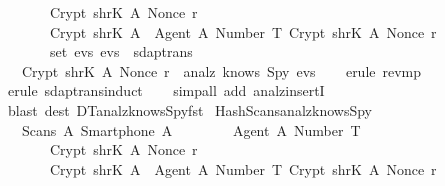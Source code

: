 \begin{isabellebody}
  \ \ \ \ \ \ \ Crypt\ {\isacharparenleft}shrK\ A{\isacharparenright}\ {\isacharparenleft}Nonce\ r{\isacharparenright}{\isacharcomma}\isanewline
  \ \ \ \ \ \ \ Crypt\ {\isacharparenleft}shrK\ A{\isacharparenright}\ {\isasymlbrace}\ {\isasymlbrace}Agent\ A{\isacharcomma}\ Number\ T{\isasymrbrace}{\isacharcomma}\ Crypt\ {\isacharparenleft}shrK\ A{\isacharparenright}\ {\isacharparenleft}Nonce\ r{\isacharparenright}\ {\isasymrbrace}\ \isanewline
  \ \ \ \ \ {\isasymrbrace}\ {\isasymin}\ set\ evs{\isacharsemicolon}\ evs\ {\isasymin}\ sdaptrans\ {\isasymrbrakk}\isanewline
  \ \ {\isasymLongrightarrow}\ Crypt\ {\isacharparenleft}shrK\ A{\isacharparenright}\ {\isacharparenleft}Nonce\ r{\isacharparenright}\ {\isasymin}\ analz\ {\isacharparenleft}knows\ Spy\ evs{\isacharparenright}{\isachardoublequoteclose}\isanewline
  \isadelimproof
  \isanewline
  \ \ %
  \endisadelimproof
  \isatagproof
  \isamarkupfalse%
  \ {\isacharparenleft}erule\ rev{\isacharunderscore}mp{\isacharparenright}\isanewline
  \ \ \isamarkupfalse%
  \ {\isacharparenleft}erule\ sdaptrans{\isachardot}induct{\isacharparenright}\isanewline
  \ \ \isamarkupfalse%
  \ {\isacharparenleft}simp{\isacharunderscore}all\ add{\isacharcolon}\ analz{\isacharunderscore}insertI{\isacharparenright}\isanewline
  \ \ \isamarkupfalse%
  \ {\isacharparenleft}blast\ dest{\isacharbang}{\isacharcolon}\ DT{}{\isacharunderscore}analz{\isacharunderscore}knows{\isacharunderscore}Spy{\isacharunderscore}fst{\isacharparenright}{\isacharplus}\isanewline
  \isamarkupfalse%
  \endisatagproof
  {\isafoldproof}%
  \isadelimproof
  \isanewline
  \endisadelimproof
  \isanewline
  \isamarkupfalse%
  \ Hash{\isacharunderscore}Scans{\isacharunderscore}analz{\isacharunderscore}knows{\isacharunderscore}Spy\ {\isacharcolon}\isanewline
  \ \ {\isachardoublequoteopen}{\isasymlbrakk}\ Scans\ A\ {\isacharparenleft}Smartphone\ A{\isacharparenright}\ {\isasymlbrace}\isanewline
  \ \ \ \ \ \ \ {\isasymlbrace}Agent\ A{\isacharcomma}\ Number\ T{\isasymrbrace}{\isacharcomma}\isanewline
  \ \ \ \ \ \ \ Crypt\ {\isacharparenleft}shrK\ A{\isacharparenright}\ {\isacharparenleft}Nonce\ r{\isacharparenright}{\isacharcomma}\isanewline
  \ \ \ \ \ \ \ Crypt\ {\isacharparenleft}shrK\ A{\isacharparenright}\ {\isasymlbrace}\ {\isasymlbrace}Agent\ A{\isacharcomma}\ Number\ T{\isasymrbrace}{\isacharcomma}\ Crypt\ {\isacharparenleft}shrK\ A{\isacharparenright}\ {\isacharparenleft}Nonce\ r{\isacharparenright}\ {\isasymrbrace}\ \isanewline

\end{isabellebody}
